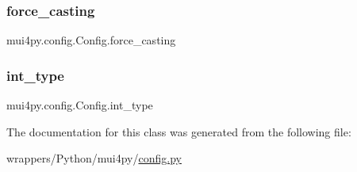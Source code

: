 \subsubsection{\texorpdfstring{force\+\_\+casting}{force\_casting}}
{\footnotesize\ttfamily mui4py.\+config.\+Config.\+force\+\_\+casting}

\mbox{\label{classmui4py_1_1config_1_1_config_abf85377c513b830c2e1aa92274e70bcc}} 
\subsubsection{\texorpdfstring{int\+\_\+type}{int\_type}}
{\footnotesize\ttfamily mui4py.\+config.\+Config.\+int\+\_\+type}



The documentation for this class was generated from the following file\+:\begin{DoxyCompactItemize}
\item 
wrappers/\+Python/mui4py/\hyperlink{config_8py}{config.\+py}\end{DoxyCompactItemize}
